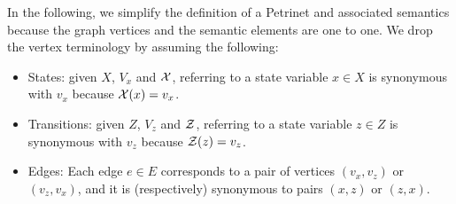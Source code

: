 In the following, we simplify the definition of a Petrinet and associated
semantics because the graph vertices and the semantic elements are one to one.  We drop
the vertex terminology by assuming the following:
\begin{itemize}
    \item States: given $X$, $V_x$ and ${\cal X}$, referring to a state
    variable $x \in X$ is synonymous with $v_x$ because ${\cal X}(x) = v_x$.
    \item Transitions: given $Z$, $V_z$ and ${\cal Z}$, referring to a state
    variable $z \in Z$ is synonymous with $v_z$ because ${\cal Z}(z) = v_z$.
    \item Edges: Each edge $e \in E$ corresponds to a pair of vertices $(v_x,
    v_z)$ or $(v_z, v_x)$, and it is (respectively) synonymous to pairs $(x, z)$
    or $(z, x)$.
\end{itemize}

